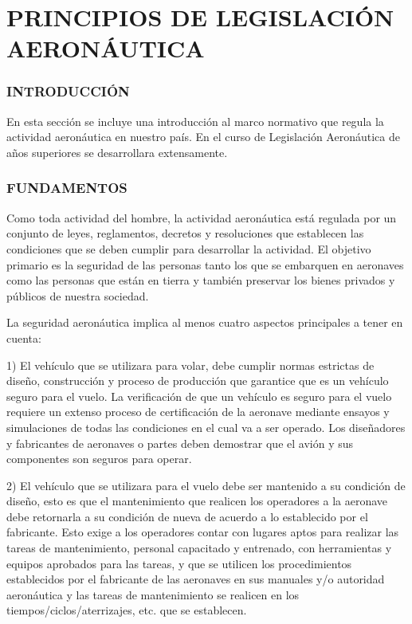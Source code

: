 \section*{PRINCIPIOS DE LEGISLACIÓN AERONÁUTICA}
\subsubsection*{INTRODUCCIÓN}
En esta sección se incluye una introducción al marco normativo que regula la actividad aeronáutica en nuestro país. En el curso de Legislación Aeronáutica de años superiores se desarrollara extensamente.

\subsubsection*{FUNDAMENTOS}
Como toda actividad del hombre, la actividad aeronáutica está regulada por un conjunto de leyes, reglamentos, decretos y resoluciones que establecen las condiciones que se deben cumplir para desarrollar la actividad. El objetivo primario es la seguridad de las personas tanto los que se embarquen en aeronaves como las personas que están en tierra y también preservar los bienes privados y públicos de nuestra sociedad.

La seguridad aeronáutica implica al menos cuatro aspectos principales a tener en cuenta:

1) El vehículo que se utilizara para volar, debe cumplir normas estrictas de diseño, construcción y proceso de producción que garantice que es un vehículo seguro para el vuelo. La verificación de que un vehículo es seguro para el vuelo requiere un extenso proceso de certificación de la aeronave mediante ensayos y simulaciones de todas las condiciones en el cual va a ser operado. Los diseñadores y fabricantes de aeronaves o partes deben demostrar que el avión y sus componentes son seguros para operar.



2) El vehículo que se utilizara para el vuelo debe ser mantenido a su condición de diseño, esto es que el mantenimiento que realicen los operadores a la aeronave debe retornarla a su condición de nueva de acuerdo a lo establecido por el fabricante. Esto exige a los operadores contar con lugares aptos para realizar las tareas de mantenimiento, personal capacitado y entrenado, con herramientas y equipos aprobados para las tareas, y que se utilicen los procedimientos establecidos por el fabricante de las aeronaves en sus manuales y/o autoridad aeronáutica y las tareas de mantenimiento se realicen en los tiempos/ciclos/aterrizajes, etc. que se establecen.

